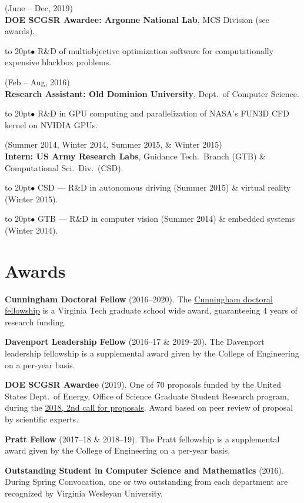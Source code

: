 \documentclass[11pt]{article}
\def\bullitem{\par\hangindent=15pt \hangafter=1
\noindent\hbox to 20pt{\hfil$\bullet$\hfil}\ignorespaces}
\begin{document}
\medskip

(June -- Dec, 2019)\\
\textbf{DOE SCGSR Awardee: Argonne National Lab}, MCS
Division (see awards).
\bullitem
R\&D of multiobjective optimization software for computationally expensive
blackbox problems.

\medskip

(Feb -- Aug, 2016)\\
\textbf{Research Assistant: Old Dominion University},
Dept.\ of Computer Science.
\bullitem
R\&D in GPU computing and parallelization of NASA's FUN3D CFD kernel on
NVIDIA GPUs.

\medskip

(Summer 2014, Winter 2014, Summer 2015, \& Winter 2015)\\
\textbf{Intern: US Army Research Labs}, Guidance Tech.\ Branch (GTB)
\& Computational Sci.\ Div.\ (CSD).
\bullitem
CSD --- R\&D in autonomous driving (Summer 2015) \&
virtual reality (Winter 2015).
\bullitem
GTB --- R\&D in computer vision (Summer 2014) \& embedded systems (Winter 2014).

\section*{Awards}

\textbf{Cunningham Doctoral Fellow} (2016--2020).
The 
\href{https://graduateschool.vt.edu/funding/types-of-funding/funding-sponsored-by-the-graduate-school/cunningham-doctoral-assistantships.html}
{Cunningham doctoral fellowship} is a Virginia Tech graduate school wide
award, guaranteeing 4 years of research funding.

\textbf{Davenport Leadership Fellow} (2016--17 \& 2019--20).
The Davenport leadership fellowship is a supplemental award given by
the College of Engineering on a per-year basis.

\textbf{DOE SCGSR Awardee} (2019).
One of 70 proposals funded by the United States Dept.\ of Energy,
Office of Science Graduate Student Research program, during the
\href{https://www.energy.gov/articles/doe-s-science-graduate-student-research-program-selects-70-students-pursue-research-doe}{2018, 2nd call for proposals}.
Award based on peer review of proposal by scientific experts.

\textbf{Pratt Fellow} (2017--18 \& 2018--19).
The Pratt fellowship is a supplemental award given by
the College of Engineering on a per-year basis.

\textbf{Outstanding Student in Computer Science and Mathematics} (2016).
During Spring Convocation, one or two outstanding from each department
are recognized by Virginia Wesleyan University.
\end{document}
